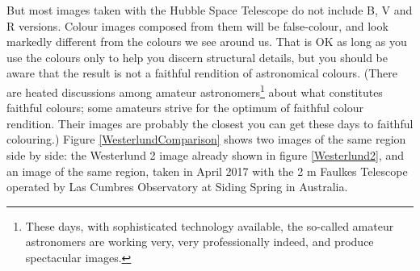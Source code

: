 \documentclass[twocolumn,apj]{openjournal}
\begin{document}
But most images taken with the Hubble Space Telescope do not include B, V and R versions. Colour images composed from them will be false-colour, and look markedly different from the colours we see around us. That is OK as long as you use the colours only to help you discern structural details, but you should be aware that the result is not a faithful rendition of astronomical colours. (There are heated discussions among amateur astronomers\footnote{These days, with sophisticated technology available, the so-called amateur astronomers are working very, very professionally indeed, and produce spectacular images.}
about what constitutes faithful colours; some amateurs strive for the optimum of faithful colour rendition. Their images are probably the closest you can get these days to faithful colouring.) Figure \ref{WesterlundComparison} shows two images of the same region side by side: the Westerlund 2 image already shown in figure \ref{Westerlund2}, and an image of the same region, taken in April 2017 with the 2 m Faulkes Telescope operated by Las Cumbres Observatory at Siding Spring in Australia. 
\end{document}
